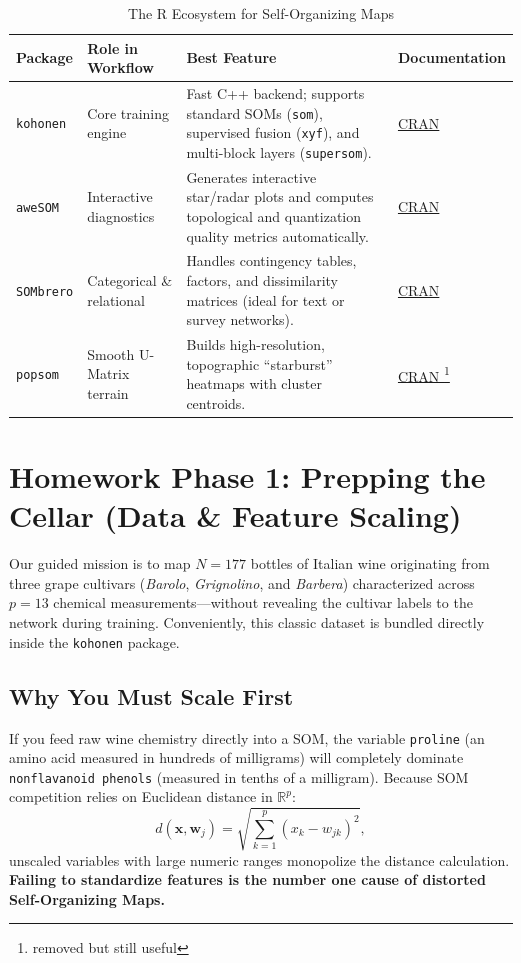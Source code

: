 \documentclass[11pt]{article}
\begin{document}
\begin{table}[htbp]
  \centering
  \caption{The R Ecosystem for Self-Organizing Maps}
  \label{tab:packages}
  \begin{tabularx}{\textwidth}{l l X l}
    \toprule
    Package & Role in Workflow & Best Feature & Documentation \\
    \midrule
    \texttt{kohonen} & Core training engine & Fast C++ backend; supports standard SOMs (\texttt{som}), supervised fusion (\texttt{xyf}), and multi-block layers (\texttt{supersom}). & \href{https://cran.r-project.org/package=kohonen}{CRAN} \\
    \texttt{aweSOM} & Interactive diagnostics & Generates interactive star/radar plots and computes topological and quantization quality metrics automatically. & \href{https://cran.r-project.org/package=aweSOM}{CRAN} \\
    \texttt{SOMbrero} & Categorical \& relational & Handles contingency tables, factors, and dissimilarity matrices (ideal for text or survey networks). & \href{https://cran.r-project.org/package=SOMbrero}{CRAN} \\
    \texttt{popsom} & Smooth U-Matrix terrain & Builds high-resolution, topographic ``starburst'' heatmaps with cluster centroids. & \href{https://cran.r-project.org/package=popsom}{CRAN \footnote{removed but still useful}} \\
    \bottomrule
  \end{tabularx}
\end{table}

\section{Homework Phase 1: Prepping the Cellar (Data \& Feature Scaling)}
\label{sec:prep}

Our guided mission is to map $N = 177$ bottles of Italian wine originating from three grape cultivars (\textit{Barolo}, \textit{Grignolino}, and \textit{Barbera}) characterized across $p = 13$ chemical measurements---without revealing the cultivar labels to the network during training. Conveniently, this classic dataset is bundled directly inside the \texttt{kohonen} package.

\subsection{Why You Must Scale First}
If you feed raw wine chemistry directly into a SOM, the variable \texttt{proline} (an amino acid measured in hundreds of milligrams) will completely dominate \texttt{nonflavanoid phenols} (measured in tenths of a milligram). Because SOM competition relies on Euclidean distance in $\mathbb{R}^p$:
\begin{equation}
  d(\mathbf{x}, \mathbf{w}_j) = \sqrt{\sum_{k=1}^{p} \left(x_k - w_{jk}\right)^2},
\end{equation}
unscaled variables with large numeric ranges monopolize the distance calculation. \textbf{Failing to standardize features is the number one cause of distorted Self-Organizing Maps.}
\end{document}
